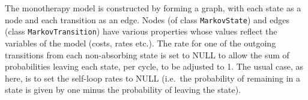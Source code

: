 \documentclass[
]{article}
\newenvironment{Shaded}{\begin{snugshade}}{\end{snugshade}}
\newcommand{\AttributeTok}[1]{\textcolor[rgb]{0.77,0.63,0.00}{#1}}
\newcommand{\CommentTok}[1]{\textcolor[rgb]{0.56,0.35,0.01}{\textit{#1}}}
\newcommand{\ConstantTok}[1]{\textcolor[rgb]{0.00,0.00,0.00}{#1}}
\newcommand{\DecValTok}[1]{\textcolor[rgb]{0.00,0.00,0.81}{#1}}
\newcommand{\FunctionTok}[1]{\textcolor[rgb]{0.00,0.00,0.00}{#1}}
\newcommand{\NormalTok}[1]{#1}
\newcommand{\OtherTok}[1]{\textcolor[rgb]{0.56,0.35,0.01}{#1}}
\newcommand{\SpecialCharTok}[1]{\textcolor[rgb]{0.00,0.00,0.00}{#1}}
\newcommand{\StringTok}[1]{\textcolor[rgb]{0.31,0.60,0.02}{#1}}
\begin{document}
The monotherapy model is constructed by forming a graph, with each state
as a node and each transition as an edge. Nodes (of class
\texttt{MarkovState}) and edges (class \texttt{MarkovTransition}) have
various properties whose values reflect the variables of the model
(costs, rates etc.). The rate for one of the outgoing transitions from
each non-absorbing state is set to NULL to allow the sum of
probabilities leaving each state, per cycle, to be adjusted to 1. The
usual case, as here, is to set the self-loop rates to NULL (i.e.~the
probability of remaining in a state is given by one minus the
probability of leaving the state).

\begin{Shaded}
\end{Shaded}
\end{document}
